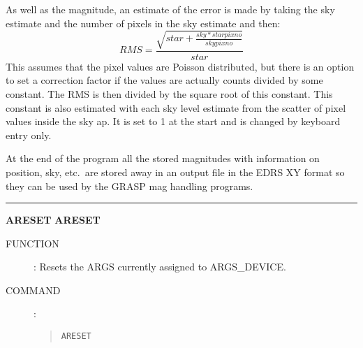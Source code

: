 \begin{description}
As well as the magnitude, an estimate of the error is made by taking the sky
estimate and the number of pixels in the sky estimate and then:
\[RMS = \frac {\sqrt{star + \frac{sky * starpixno}{skypixno}}}{star}\]
This assumes that the pixel values are Poisson distributed, but there is an
option to set a correction factor if the values are actually counts divided 
by some constant.
The RMS is then divided by the square root of this constant.
This constant is also estimated with each sky level estimate from the scatter
of pixel values inside the sky ap.
It is set to 1 at the start and is changed by keyboard entry only.

At the end of the program all the stored magnitudes with information on
position, sky, etc.\ are stored away in an output file in the EDRS XY format
so they can be used by the GRASP mag handling programs.
\end{description}

\goodbreak
\rule{\textwidth}{0.3mm}
{\Large {\bf ARESET} \hfill {\bf ARESET}}
\begin{description}
\item [FUNCTION]:
Resets the ARGS currently assigned to ARGS\_DEVICE.
\item [COMMAND]:
\begin{quote}
{\tt ARESET}
\end{quote}
\end{description}

